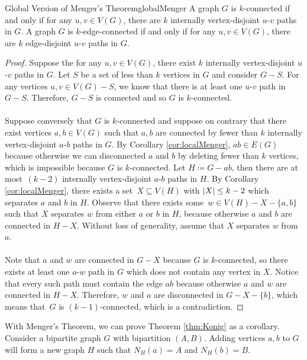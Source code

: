 \documentclass[math]{amznotes}
\theoremstyle{remark}
\newcommand{\0}{\mathbf{0}}
\newcommand{\1}{\mathbf{1}}
\begin{document}
\begin{corbox}{Global Version of Menger's Theorem}{globalMenger}
    A graph $G$ is $k$-connected if and only if for any $u, v \in V(G)$, there are $k$ internally vertex-disjoint $u$-$v$ paths in $G$. A graph $G$ is $k$-edge-connected if and only if for any $u, v \in V(G)$, there are $k$ edge-disjoint $u$-$v$ paths in $G$. 
    \tcblower
    \begin{proof}
        Suppose the for any $u, v \in V(G)$, there exist $k$ internally vertex-disjoint $u$-$v$ paths in $G$. Let $S$ be a set of less than $k$ vertices in $G$ and consider $G - S$. For any vertices $u, v \in V(G) - S$, we know that there is at least one $u$-$v$ path in $G - S$. Therefore, $G - S$ is connected and so $G$ is $k$-connected.
        \\\\
        Suppose conversely that $G$ is $k$-connected and suppose on contrary that there exist vertices $a, b \in V(G)$ such that $a, b$ are connected by fewer than $k$ internally vertex-disjoint $a$-$b$ paths in $G$. By Corollary \ref{cor:localMenger}, $ab \in E(G)$ because otherwise we can disconnected $a$ and $b$ by deleting fewer than $k$ vertices, which is impossible because $G$ is $k$-connected. Let $H \coloneqq G - ab$, then there are at most~$(k - 2)$ internally vertex-disjoint $a$-$b$ paths in $H$. By Corollary \ref{cor:localMenger}, there exists a set~$X \subseteq V(H)$ with ${\left\lvert {X} \right\rvert} \leq k - 2$ which separates $a$ and $b$ in $H$. Observe that there exists some~$w \in V(H) - X - \{a, b\}$ such that $X$ separates $w$ from either $a$ or $b$ in $H$, because otherwise $a$ and $b$ are connected in $H - X$. Without loss of generality, assume that $X$ separates $w$ from $a$. 
        \\\\
        Note that $a$ and $w$ are connected in $G - X$ because $G$ is $k$-connected, so there exists at least one $a$-$w$ path in $G$ which does not contain any vertex in $X$. Notice that every such path must contain the edge $ab$ because otherwise $a$ and $w$ are connected in $H - X$. Therefore, $w$ and $a$ are disconnected in $G - X - \{b\}$, which means that~$G$ is $(k - 1)$-connected, which is a contradiction.
    \end{proof}
\end{corbox}
With Menger's Theorem, we can prove Theorem \ref{thm:Konig} as a corollary. Consider a bipartite graph $G$ with bipartition $(A, B)$. Adding vertices $a, b$ to $G$ will form a new graph $H$ such that $N_H(a) = A$ and $N_H(b) = B$.
\end{document}
